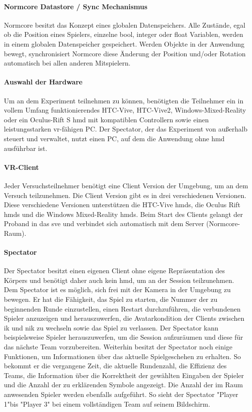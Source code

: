\documentclass[a4paper,11pt]{article}%
\renewcommand{\\}{\vspace*{0.5\baselineskip} \newline}
\begin{document}
\paragraph{Normcore Datastore / Sync Mechanismus}
Normcore besitzt das Konzept eines globalen Datenspeichers.  Alle Zustände, egal ob die Position eines Spielers, einzelne bool, integer oder float Variablen, werden in einem globalen Datenspeicher gespeichert. Werden Objekte in der Anwendung bewegt, synchronisiert Normcore diese Änderung der Position und/oder Rotation automatisch bei allen anderen Mitspielern.

\paragraph{Auswahl der Hardware}
Um an dem Experiment teilnehmen zu können, benötigten die Teilnehmer ein in vollem Umfang funktionierendes HTC-Vive, HTC-Vive2, Windows-Mixed-Reality oder ein Oculus-Rift S \ac{hmd} mit kompatiblen Controllern sowie einen leistungsstarken \ac{vr}-fähigen PC. Der Spectator, der das Experiment von außerhalb steuert und verwaltet, nutzt einen PC, auf dem die Anwendung ohne \ac{hmd} ausführbar ist.

\paragraph{VR-Client}
Jeder Versuchsteilnehmer benötigt eine Client Version der Umgebung, um an dem Versuch teilzunehmen. Die Client Version gibt es in drei verschiedenen Versionen. Diese verschiedene Versionen unterstützen die HTC-Vive \ac{hmd}s, die Oculus Rift \ac{hmd}s und die Windows Mixed-Reality \ac{hmd}s. Beim Start des Clients gelangt der Proband in das \ac{sve} und verbindet sich automatisch mit dem Server (Normcore-Raum).

\paragraph{Spectator}
Der Spectator besitzt einen eigenen Client ohne eigene Repräsentation des Körpers und benötigt daher auch kein \ac{hmd}, um an der Session teilzunehmen. Dem Spectator ist es möglich, sich frei mit der Kamera in der Umgebung zu bewegen.
Er hat die Fähigkeit, das Spiel zu starten, die Nummer der zu beginnenden Runde einzustellen, einen Restart durchzuführen, die verbundenen Spieler anzuzeigen und herauszuwerfen, die Avatarkondition der Clients zwischen \ac{ik} und \ac{nik} zu wechseln sowie das Spiel zu verlassen.
Der Spectator kann beispielsweise Spieler herauszuwerfen, um die Session aufzuräumen und diese für das nächste Team vorzubereiten. Weiterhin besitzt der Spectator noch einige Funktionen, um Informationen über das aktuelle Spielgeschehen zu erhalten. So bekommt er die vergangene Zeit, die aktuelle Rundenzahl, die Effizienz des Teams, die Information über die Korrektheit der gewählten Eingaben der Spieler und die Anzahl der zu erklärenden Symbole angezeigt. Die Anzahl der im Raum anwesenden Spieler werden ebenfalls aufgeführt. So sieht der Spectator "Player 1"bis "Player 3" bei einem vollständigen Team auf seinem Bildschirm. 
\end{document}
